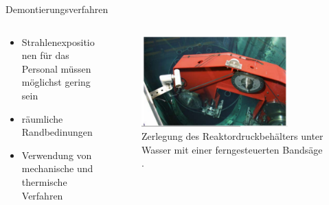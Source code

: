 \begin{frame}{Demontierungsverfahren}
  \begin{columns}

    \begin{column}{0.48\textwidth}
    \begin{itemize}
      \setlength\itemsep{1.2em}
      \item{Strahlenexpositionen für das Personal müssen möglichst gering sein }
      \item{ räumliche Randbedinungen }
      \item{ Verwendung von mechanische und thermische Verfahren }

    \end{itemize}

    \end{column}

    \begin{column}{0.48\textwidth}
      \begin{figure}
         \centering
         \includegraphics[width=0.8\textwidth]{./bilder/zerlegung_bandsaege.PNG}
         \caption{Zerlegung des Reaktordruckbehälters unter Wasser mit einer ferngesteuerten Bandsäge \cite{stilllegung_grs}. }
         \label{ fig: abbau_roboter}
       \end{figure}
    \end{column}

  \end{columns}
\end{frame}



